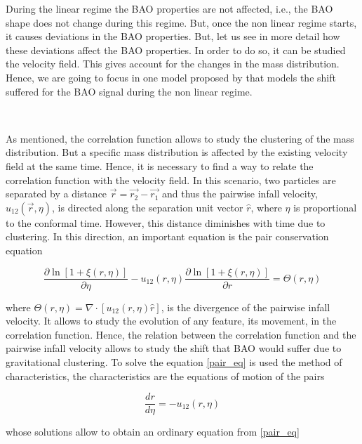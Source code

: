 
During the linear regime the BAO properties are not affected, i.e., the BAO shape does not 
change during this regime. But, once the non linear regime starts, it causes deviations in
the BAO properties. But, let us see in more detail how these deviations affect the BAO
properties. 
In order to do so, it can be studied the velocity field. This gives account for the changes
in the mass distribution. Hence, we are going to focus in one model proposed by \cite{motion}
that models the shift suffered for the BAO signal during the non linear regime. 

\

As mentioned, the correlation function allows to study the clustering of the mass distribution. But a
specific mass distribution is affected by the existing velocity field at the same time.  
Hence, it is necessary to find a way to relate the correlation function with the velocity 
field. In this scenario, two particles are separated by
a distance $\vec{r} = \vec{r_2} - \vec{r_1}$ and thus the pairwise infall velocity, 
$u_{12}(\vec{r},\eta)$, is directed along the separation unit vector $\hat{r}$, where
$\eta$ is proportional to the conformal time.
However, this distance diminishes with time due to clustering. In this direction, 
an important equation is the pair conservation equation

\begin{equation}
\frac{\partial \ln[1+\xi(r,\eta)]}{\partial \eta} - u_{12}(r,\eta)\frac{\partial \ln[1+\xi(r,\eta)]}{\partial r} = \Theta(r,\eta)
\label{pair_eq}
\end{equation}

where $\Theta(r,\eta) = \nabla \cdot [u_{12}(r,\eta)\hat{r}]$, is the divergence 
of the pairwise infall velocity. 
It allows to study the evolution of any feature, its movement, in the correlation function.
Hence, the relation between the correlation function and the pairwise infall velocity allows
to study the shift that BAO would suffer due to gravitational clustering. 
To solve the equation \ref{pair_eq} is used the method of characteristics, the characteristics 
are the equations of motion  of the pairs 

\begin{equation}
\frac{dr}{d\eta}=-u_{12}(r,\eta)
\label{charact}
\end{equation}

whose solutions allow to obtain an ordinary equation from \ref{pair_eq} 

